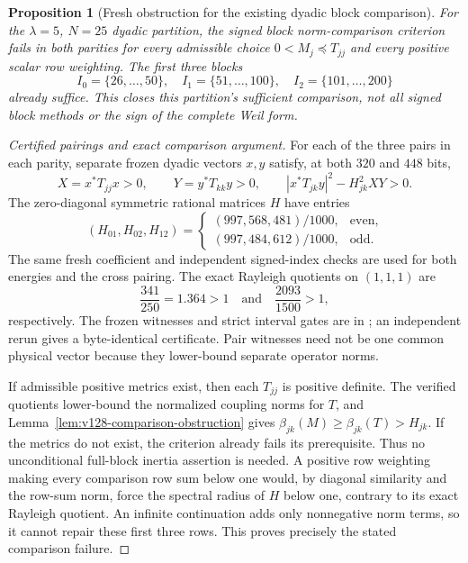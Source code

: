 \documentclass[11pt]{article}
\newtheorem{proposition}[theorem]{Proposition}
\theoremstyle{remark}
\begin{document}
\begin{proposition}[Fresh obstruction for the existing dyadic block comparison]
\label{prop:v152-block-comparison}
For the $\lambda=5$, $N=25$ dyadic partition, the signed block
norm-comparison criterion fails in both parities for every admissible
choice $0<M_j\preceq T_{jj}$ and every positive scalar row weighting.
The first three blocks
\[
 I_0=\{26,\ldots,50\},\quad I_1=\{51,\ldots,100\},\quad
 I_2=\{101,\ldots,200\}
\]
already suffice. This closes this partition's sufficient comparison,
not all signed block methods or the sign of the complete Weil form.
\end{proposition}
\begin{proof}[Certified pairings and exact comparison argument]
For each of the three pairs in each parity, separate frozen dyadic
vectors $x,y$ satisfy, at both $320$ and $448$ bits,
\[
 X=x^*T_{jj}x>0,\qquad Y=y^*T_{kk}y>0,\qquad
 |x^*T_{jk}y|^2-H_{jk}^2XY>0.
\]
The zero-diagonal symmetric rational matrices $H$ have entries
\[
 (H_{01},H_{02},H_{12})=
 \begin{cases}(997,568,481)/1000,&\text{even},\\
              (997,484,612)/1000,&\text{odd}.
 \end{cases}
\]
The same fresh coefficient and independent signed-index checks are
used for both energies and the cross pairing. The exact Rayleigh
quotients on $(1,1,1)$ are
\[
 \frac{341}{250}=1.364>1\quad\text{and}\quad
 \frac{2093}{1500}>1,
\]
respectively. The frozen witnesses and strict interval gates are in
; an independent rerun gives a
byte-identical certificate. Pair witnesses need not be one common
physical vector because they lower-bound separate operator norms.

If admissible positive metrics exist, then each $T_{jj}$ is positive
definite. The verified quotients lower-bound the normalized coupling
norms for $T$, and Lemma~\ref{lem:v128-comparison-obstruction} gives
$\beta_{jk}(M)\ge\beta_{jk}(T)>H_{jk}$. If the metrics do not exist,
the criterion already fails its prerequisite. Thus no unconditional
full-block inertia assertion is needed. A positive row weighting making
every comparison row sum below one would, by diagonal similarity and
the row-sum norm, force the spectral radius of $H$ below one, contrary
to its exact Rayleigh quotient. An infinite continuation adds only
nonnegative norm terms, so it cannot repair these first three rows.
This proves precisely the stated comparison failure.
\end{proof}
\end{document}
